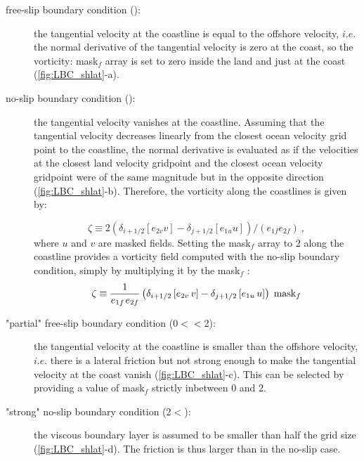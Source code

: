 \documentclass[../tex_main/NEMO_manual]{subfiles}
\begin{document}
\begin{description}

\item[free-slip boundary condition ():] the tangential velocity at
  the coastline is equal to the offshore velocity,
  $i.e.$ the normal derivative of the tangential velocity is zero at the coast,
  so the vorticity: mask$_{f}$ array is set to zero inside the land and just at the coast
  (\autoref{fig:LBC_shlat}-a).

\item[no-slip boundary condition ():] the tangential velocity vanishes at the coastline.
  Assuming that the tangential velocity decreases linearly from
  the closest ocean velocity grid point to the coastline,
  the normal derivative is evaluated as if the velocities at the closest land velocity gridpoint and
  the closest ocean velocity gridpoint were of the same magnitude but in the opposite direction
  (\autoref{fig:LBC_shlat}-b).
  Therefore, the vorticity along the coastlines is given by: 

\[
\zeta \equiv 2 \left(\delta_{i+1/2} \left[e_{2v} v \right] - \delta_{j+1/2} \left[e_{1u} u \right] \right) / \left(e_{1f} e_{2f} \right) \ ,
\]
where $u$ and $v$ are masked fields.
Setting the mask$_{f}$ array to $2$ along the coastline provides a vorticity field computed with
the no-slip boundary condition, simply by multiplying it by the mask$_{f}$ :
\begin{equation} \label{eq:lbc_bbbb}
\zeta \equiv \frac{1}{e_{1f} {\kern 1pt}e_{2f} }\left( {\delta_{i+1/2} 
\left[ {e_{2v} \,v} \right]-\delta_{j+1/2} \left[ {e_{1u} \,u} \right]} 
\right)\;\mbox{mask}_f 
\end{equation}

\item["partial" free-slip boundary condition (0$<$$<$2):] the tangential velocity at
  the coastline is smaller than the offshore velocity, $i.e.$ there is a lateral friction but
  not strong enough to make the tangential velocity at the coast vanish (\autoref{fig:LBC_shlat}-c).
  This can be selected by providing a value of mask$_{f}$ strictly inbetween $0$ and $2$.

\item["strong" no-slip boundary condition (2$<$):] the viscous boundary layer is assumed to
  be smaller than half the grid size (\autoref{fig:LBC_shlat}-d).
  The friction is thus larger than in the no-slip case.

\end{description}
\end{document}
